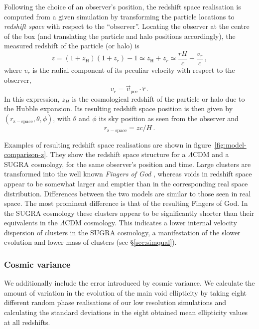 Following the choice of an observer's position, the redshift space realisation is computed from a given 
simulation by transforming the particle locations to \emph{redshift space} with respect to 
the ``observer''. Locating the observer at the centre of the box (and translating the particle and 
halo positions accordingly), the measured redshift of the particle (or halo) is 
\begin{equation}
z = (1+z_\mathrm{H})(1+z_r) -1 \simeq z_\mathrm{H}+z_r \simeq \frac{rH}{c} + \frac{v_r}{c} \,,
\end{equation}
where $v_r$ is the radial component of its peculiar velocity with respect to 
the observer, 
\begin{equation}
v_r = \vec{v}_\mathrm{pec} \cdot \hat{r}\,.
\end{equation}
In this expression, $z_H$ is the cosmological redshift of the particle or halo due to the Hubble expansion. 
Its resulting redshift space position is then given by $(r_\mathrm{z-space},\theta,\phi)$, with $\theta$ and $\phi$ 
its sky position as seen from the observer and  
\begin{equation}
r_\mathrm{z-space} = zc/H \,.
\end{equation}

Examples of resulting redshift space realisations are shown in figure~\ref{fig:model-comparison-z}. They show the 
redshift space structure for a $\Lambda$CDM and a SUGRA cosmology, for the same observer's position and time. Large 
clusters are transformed into the well known \emph{Fingers of God} \citep{jackson72}, whereas voids in redshift space appear to be somewhat 
larger and emptier than in the corresponding real space distribution. Differences between the two models are similar to those seen 
in real space. The most prominent difference is that of the resulting Fingers of God. In the SUGRA cosmology these 
clusters appear to be significantly shorter than their equivalents in the $\Lambda$CDM cosmology. This indicates  
a lower internal velocity dispersion of clusters in the SUGRA cosmology, a manifestation of the slower evolution and 
lower mass of clusters (see \S\ref{sec:simqual}).

\subsubsection{Cosmic variance}
We additionally include the error introduced by cosmic variance.
We calculate the amount of variation in the evolution of the main void ellipticity by taking 
eight different random phase realisations of our low resolution simulations and calculating the standard 
deviations in the eight obtained mean ellipticity values at all redshifts. 

